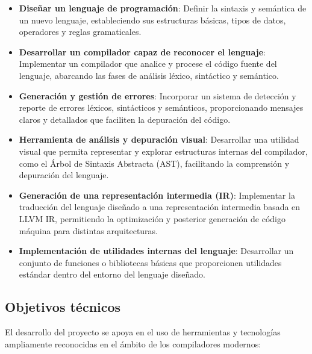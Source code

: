 
\begin{itemize}
    \item \textbf{Diseñar un lenguaje de programación}: 
    Definir la sintaxis y semántica de un nuevo lenguaje, estableciendo sus estructuras básicas, tipos de datos, operadores y reglas gramaticales.

    \item \textbf{Desarrollar un compilador capaz de reconocer el lenguaje}: 
    Implementar un compilador que analice y procese el código fuente del lenguaje, abarcando las fases de análisis léxico, sintáctico y semántico.

    \item \textbf{Generación y gestión de errores}: 
    Incorporar un sistema de detección y reporte de errores léxicos, sintácticos y semánticos, proporcionando mensajes claros y detallados que faciliten la depuración del código.

    \item \textbf{Herramienta de análisis y depuración visual}: 
    Desarrollar una utilidad visual que permita representar y explorar estructuras internas del compilador, como el Árbol de Sintaxis Abstracta (AST), facilitando la comprensión y depuración del lenguaje.

    \item \textbf{Generación de una representación intermedia (IR)}: 
    Implementar la traducción del lenguaje diseñado a una representación intermedia basada en LLVM IR, permitiendo la optimización y posterior generación de código máquina para distintas arquitecturas.

    \item \textbf{Implementación de utilidades internas del lenguaje}: 
    Desarrollar un conjunto de funciones o bibliotecas básicas que proporcionen utilidades estándar dentro del entorno del lenguaje diseñado.
\end{itemize}

\subsection{Objetivos técnicos}

El desarrollo del proyecto se apoya en el uso de herramientas y tecnologías ampliamente reconocidas en el ámbito de los compiladores modernos:

